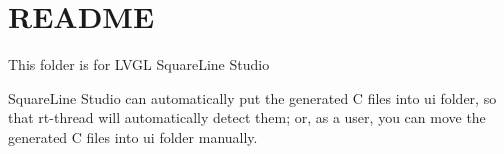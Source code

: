 \chapter{README}
\hypertarget{md_managed__components_2lvgl____lvgl_2env__support_2rt-thread_2squareline_2README}{}\label{md_managed__components_2lvgl____lvgl_2env__support_2rt-thread_2squareline_2README}
This folder is for LVGL Square\+Line Studio

Square\+Line Studio can automatically put the generated C files into {\ttfamily ui} folder, so that rt-\/thread will automatically detect them; or, as a user, you can move the generated C files into {\ttfamily ui} folder manually. 